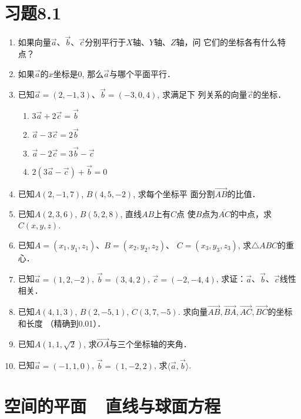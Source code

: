 \section*{习题8.1}

\begin{enumerate}
    \item 如果向量$\vec{a}$、$\vec{b}$、$\vec{c}$分别平行于$X$轴、$Y$轴、$Z$轴，问
    它们的坐标各有什么特点？
    \item 
    如果$\vec{a}$的$x$坐标是0, 那么$\vec{a}$与哪个平面平行．
    \item 已知$\vec{a}=(2,-1,3)$、$\vec{b}=(-3,0,4)$, 求满足下
    列关系的向量$\vec{c}$的坐标．
\begin{multicols}{2}
\begin{enumerate}
    \item $3\vec{a}+2\vec{c}=\vec{b}$
    \item $\vec{a}-3\vec{c}=2\vec{b}$
    \item $\vec{a}-2\vec{c}=3\vec{b}-\vec{c}$
    \item $2(3\vec{a}-\vec{c})+\vec{b}=0$
\end{enumerate}
\end{multicols}
    \item 已知$A(2,-1,7)$, $B(4,5,-2)$, 求每个坐标平
    面分割$\Vec{AB}$的比值．
    \item 已知$A(2,3,6)$, $B(5,2,8)$, 直线$AB$上有$C$点
    使$B$点为$\overline{AC}$的中点，求$C(x,y,z)$.
    \item 已知$A=(x_1,y_1,z_1)$、$B=(x_2,y_2,z_2)$、
    $C=(x_3,y_3,z_3)$, 求$\triangle ABC$的重心．

    \item 已知$\vec{a}=(1,2,-2)$, $\vec{b}=(3,4,2)$,
    $\vec{c}=(-2,-4,4)$, 求证：$\vec{a}$、$\vec{b}$、$\vec{c}$线性相关．

    \item 已知$A(4,1,3)$, $B(2,-5,1)$, $C(3,7,-5)$. 求向量$\Vec{AB},\Vec{BA},\Vec{AC},\Vec{BC}$的坐标和长度
    （精确到0.01）．
    \item 已知$A(1,1,\sqrt{2})$, 求$\Vec{OA}$与三个坐标轴的夹角．
    \item 已知$\vec{a}=(-1,1,0)$, $\vec{b}=(1,-2,2)$,
    求$\langle \vec{a},\vec{b}\rangle$.
\end{enumerate}

\section{空间的平面~~直线与球面方程}

